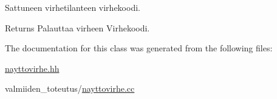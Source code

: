 Sattuneen virhetilanteen virhekoodi. 

\begin{DoxyReturn}{Returns}
Palauttaa virheen {\ttfamily Virhekoodi}. 
\end{DoxyReturn}


The documentation for this class was generated from the following files\+:\begin{DoxyCompactItemize}
\item 
\hyperlink{nayttovirhe_8hh}{nayttovirhe.\+hh}\item 
valmiiden\+\_\+toteutus/\hyperlink{nayttovirhe_8cc}{nayttovirhe.\+cc}\end{DoxyCompactItemize}
